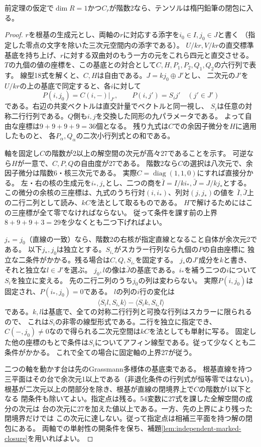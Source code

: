 \begin{lemma}\label{lem:defect-one-rank-two}
前定理の仮定で$\dim R=1$かつ$C_r$が階数2なら、テンソルは楕円鉛筆の閉包に入る。
\end{lemma}
\begin{proof}
$r$を根基の生成元とし、両軸の$r$に対応する添字を$i_0\in I,j_0\in J$と書く
（指定した零点の文字を除いた三次元空間内の添字である）。
$U/kr,V/kr$の直交標準基底を持ち上げ、$r$に対する双曲対のもう一方の元をこれら四元と直交させる。
$T$の九個の値の座標を、この基底との対合として$C,H,P_1,P_2,Q_1,Q_2$の六行列で表す。
線型18式を解くと、$C,H$は自由である。$J=kj_0\oplus J'$とし、
二次元の$J'$を$U/kr$の上の基底で同定すると、各$i$に対して
\[
 P(i,j_0)=C(i,-)|_{J'},\qquad P(i,j')=S_i j'\quad (j'\in J')
\]
である。右辺の共変ベクトルは直交計量でベクトルと同一視し、
$S_i$は任意の対称二行行列である。$Q$側も$i,j$を交換した同形の九パラメータである。
よって自由な座標は$9+9+9+9=36$個となる。
残り九式は$C$での余因子微分を$H$に適用したものと、
各$P_\alpha,Q_\alpha$の二次小行列式との和である。

軸を固定し$C$の階数が2以上の解空間の次元が高々27であることを示す。
可逆なら$H$が一意で、$C,P,Q$の自由度が27である。
階数2なら$C$の選択は八次元で、余因子微分は階数6・核三次元である。
実際$C=\operatorname{diag}(1,1,0)$にすれば直接分かる。
左・右の核の生成元を$i_*,j_*$とし、二つの商を$\bar I=I/ki_*,\bar J=J/kj_*$とする。
この微分の余核の三座標は、九式のうち行対$(i,i_*)$、列対$(j,j_*)$の値を
$\bar I,\bar J$上の二行二列として読み、$kC$を法として取るものである。
$H$で解けるためにはこの三座標が全て零でなければならない。
従って条件を課す前の上界$8+9+9+3=29$を少なくとも二つ下げればよい。

$j_*=j_0$（直線の一致）なら、階数2の右核が指定直線となること自体が余次元2である。
以下$j_*,j_0$は独立とする。$S_{i_*}$がスカラー行列なら九個の$P$の自由座標に
独立な二条件がかかる。残る場合は$C,Q,S_{i_*}$を固定する。
$j_*$の$J'$成分を$k$と書き、それと独立な$l\in J'$を選ぶ。
$j_0,l$の像は$\bar J$の基底である。$i_*$を補う二つの$i$について$S_i$を独立に変える。
先の二行二列のうち$j_0$の列は変わらない。
実際$P(i,j_0)$は固定され、$P(i_*,j_0)=0$である。
$l$の列の$i$行の変化は
\[
  \langle \dot S_i l,S_{i_*} k\rangle-\langle\dot S_i k,S_{i_*} l\rangle
\]
である。$k,l$は基底で、全ての対称二行行列と可換な行列はスカラーに限られるので、
これは$\dot S_i$の非零の線型形式である。二行を独立に指定でき、
$C(-,j_0)\ne0$なので得られる二次元空間は$kC$を法としても単射に写る。
固定した他の座標のもとで条件は$S_i$についてアフィン線型である。従って少なくとも二条件がかかる。
これで全ての場合に固定軸の上界27が従う。

二つの軸を動かす台は先のGrassmann多様体の基底束である。
根基直線を持つ三平面はその台で余次元1以上である（非退化条件の行列式が恒等零ではない）。
根基が二次元以上の閉部分を除き、根基が直線の閉境界上で$C$の階数が1以下となる
閉条件も除いてよい。指定点は残る。54変数に27式を課した全解空間の成分の次元は
台の次元に27を加えた値以上である。一方、先の上界により残った閉境界だけでは
この次元に達しない。従って指定点は相補三平面を持つ解の閉包にある。
両軸での単射性の開条件を保ち、補題\ref{lem:independent-marked-closure}を用いればよい。
\end{proof}

